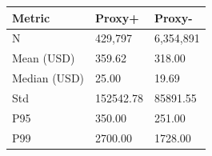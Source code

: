 \begin{tabular}{lll}
\toprule
Metric & Proxy+ & Proxy- \\
\midrule
N & 429,797 & 6,354,891 \\
Mean (USD) & 359.62 & 318.00 \\
Median (USD) & 25.00 & 19.69 \\
Std & 152542.78 & 85891.55 \\
P95 & 350.00 & 251.00 \\
P99 & 2700.00 & 1728.00 \\
\bottomrule
\end{tabular}
